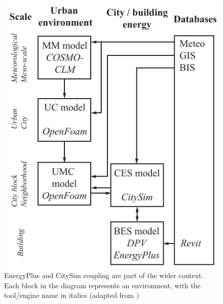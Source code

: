 \documentclass{tBPS2e}
\theoremstyle{plain}
\theoremstyle{definition}
\theoremstyle{remark}
\begin{document}
\begin{figure}
\centering
\includegraphics[scale=1.0]{figures/UMEM_overview_new}
\caption{EnergyPlus and CitySim coupling are part of the wider context. Each block in the diagram represents an environment, with the tool/engine name in italics (adapted from \citep{Dorer:2013vt})}
\label{fig:UMEM}
\end{figure}
\end{document}
